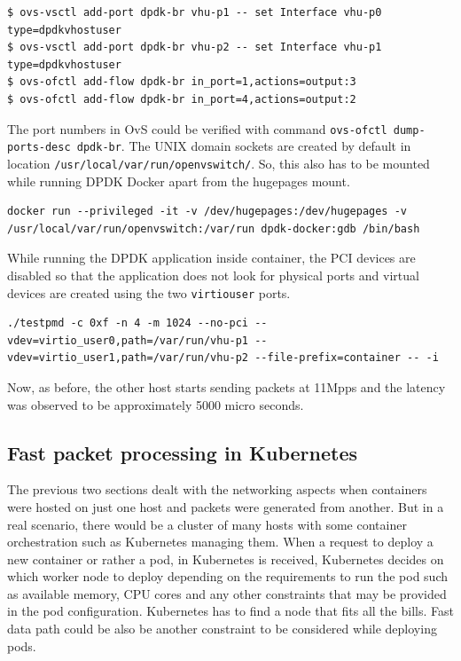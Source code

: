 \documentclass[english, 12pt, a4paper, elec, utf8, a-1b, online]{aaltothesis}
\begin{document}
\begin{lstlisting}[basicstyle={\small\ttfamily}]
$ ovs-vsctl add-port dpdk-br vhu-p1 -- set Interface vhu-p0 type=dpdkvhostuser
$ ovs-vsctl add-port dpdk-br vhu-p2 -- set Interface vhu-p1 type=dpdkvhostuser
$ ovs-ofctl add-flow dpdk-br in_port=1,actions=output:3
$ ovs-ofctl add-flow dpdk-br in_port=4,actions=output:2
\end{lstlisting}

The port numbers in OvS could be verified with command \lstinline{ovs-ofctl dump-ports-desc dpdk-br}. The UNIX domain sockets are created by default in location \lstinline{/usr/local/var/run/openvswitch/}. So, this also has to be mounted while running DPDK Docker apart from the hugepages mount.

\begin{lstlisting}[basicstyle={\small\ttfamily}]
docker run --privileged -it -v /dev/hugepages:/dev/hugepages -v /usr/local/var/run/openvswitch:/var/run dpdk-docker:gdb /bin/bash
\end{lstlisting}

While running the DPDK application inside container, the PCI devices are disabled so that the application does not look for physical ports and virtual devices are created using the two \lstinline{virtiouser} ports.

\begin{lstlisting}[basicstyle={\small\ttfamily}]
./testpmd -c 0xf -n 4 -m 1024 --no-pci --vdev=virtio_user0,path=/var/run/vhu-p1 --vdev=virtio_user1,path=/var/run/vhu-p2 --file-prefix=container -- -i
\end{lstlisting}

Now, as before, the other host starts sending packets at 11Mpps and the latency was observed to be approximately 5000 micro seconds.

\subsection{Fast packet processing in Kubernetes}
The previous two sections dealt with the networking aspects when containers were hosted on just one  host and packets were generated from another. But in a real scenario, there would be a cluster of many hosts with some container orchestration such as Kubernetes managing them. When a request to deploy a new container or rather a pod, in Kubernetes is received, Kubernetes decides on which worker node to deploy depending on the requirements to run the pod such as available memory, CPU cores and any other constraints that may be provided in the pod configuration. Kubernetes has to find a node that fits all the bills. Fast data path could be also be another constraint to be considered while deploying pods. 
\end{document}
